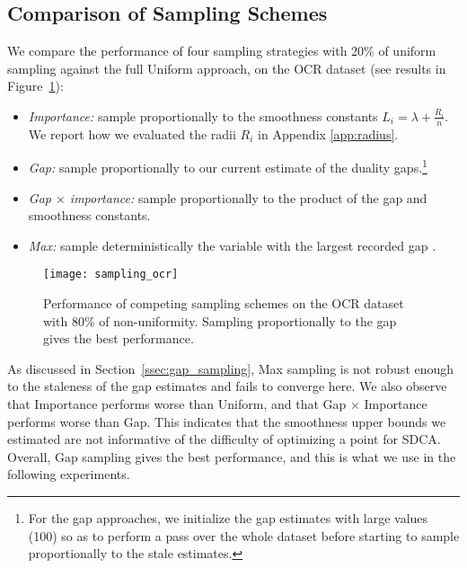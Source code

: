 \subsection{Comparison of Sampling Schemes} \label{experiment sampling}
We compare the performance of four sampling strategies with 20\% of uniform sampling against the full Uniform approach, on the OCR dataset (see results in Figure~\ref{fig:comparison sampling schemes}):\vspace{-2mm}
\begin{itemize}
	\item \textit{Importance:} sample proportionally to the smoothness constants $L_i = \lambda +\frac{R_i}{n}$. We report how we evaluated the radii $R_i$ in Appendix \ref{app:radius}. \vspace{-2mm}
	\item \textit{Gap:} sample proportionally to our current estimate of the duality gaps.\footnote{
		For the gap approaches, we initialize the gap estimates with large values (100) so as to perform a pass over the whole dataset before starting to sample proportionally to the stale estimates.
	} \vspace{-2mm}
	\item \textit{Gap $\times$ importance:} sample proportionally to the product of the gap and smoothness constants. \vspace{-2mm}
	\item \textit{Max:} sample deterministically the variable with the largest recorded gap \citep{dunner2017efficient}.
\end{itemize}
\begin{figure}[t]
	\centering \texttt{[image: sampling\_ocr]}
	\caption[
	Performance of competing sampling schemes on the OCR dataset 
	]{
		Performance of competing sampling schemes on the OCR dataset with 80\% of non-uniformity. Sampling proportionally to the gap gives the best performance.
	}
	\label{fig:comparison sampling schemes}
\end{figure}

As discussed in Section~\ref{ssec:gap_sampling}, Max sampling is not robust enough to the staleness of the gap estimates and fails to converge here.
We also observe that Importance performs worse than Uniform, and that Gap $\times$ Importance performs worse than Gap.
This indicates that the smoothness upper bounds we estimated are not informative of the difficulty of optimizing a point for SDCA.
Overall, Gap sampling gives the best performance, and this is what we use in the following experiments.

